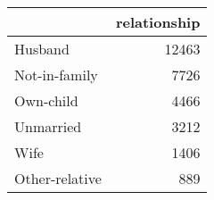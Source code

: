\begin{tabular}{lr}
\toprule
{} &  relationship \\
\midrule
 Husband        &         12463 \\
 Not-in-family  &          7726 \\
 Own-child      &          4466 \\
 Unmarried      &          3212 \\
 Wife           &          1406 \\
 Other-relative &           889 \\
\bottomrule
\end{tabular}
